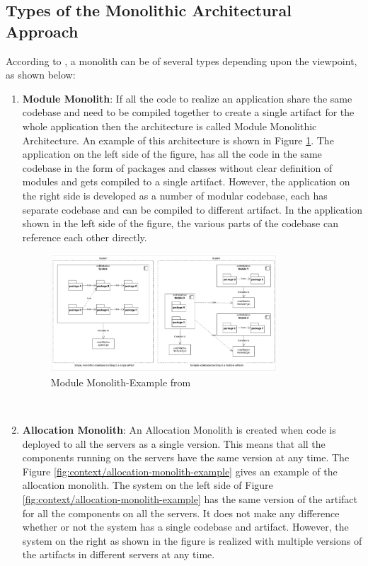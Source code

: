 \subsection{Types of the Monolithic Architectural Approach}\label{subsection:context/monolith-types}
According to \cite{Annett:2014aa}, a monolith can be of several types depending upon the viewpoint, as shown below:
\begin{enumerate}
\item \textbf{Module Monolith}: If all the code to realize an application share the same codebase and need to be compiled together to create a single artifact for the whole application then the architecture is called Module Monolithic Architecture. An example of this architecture is shown in Figure \ref{fig:context/module-monolith-example}. The application on the left side of the figure, has all the code in the same codebase in the form of packages and classes without clear definition of modules and gets compiled to a single artifact. However, the application on the right side is developed as a number of modular codebase, each has separate codebase and can be compiled to different artifact. In the application shown in the left side of the figure, the various parts of the codebase can reference each other directly.

\begin{figure}[H]
\begin{center}
\includegraphics[width=0.8\textwidth]{figures/context-module-monolith}
\caption{Module Monolith-Example from \cite{Annett:2014aa}}
\label{fig:context/module-monolith-example}
\end{center}
\end{figure}

\\
\item \textbf{Allocation Monolith}: An Allocation Monolith is created when code is deployed to all the servers as a single version. This means that all the components running on the servers have the same version at any time. The Figure \ref{fig:context/allocation-monolith-example} gives an example of the allocation monolith. The system on the left side of Figure \ref{fig:context/allocation-monolith-example} has the same version of the artifact for all the components on all the servers. It does not make any difference whether or not the system has a single codebase and artifact. However, the system on the right as shown in the figure is realized with multiple versions of the artifacts in different servers at any time.


\end{enumerate}
